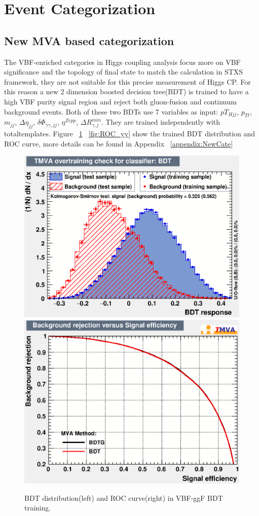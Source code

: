 \section{Event Categorization}
\label{sec:Category}

\subsection{New MVA based categorization}
The VBF-enriched categories in Higgs coupling analysis focus more on VBF significance and the topology of final state to match the calculation in STXS framework, they are not suitable  for this precise measurement of Higgs CP. For this reason a new 2 dimension boosted decision tree(BDT) is trained to have a high VBF purity signal region and reject both gluon-fusion and continuum \todo{$\gamma\gamma$} background events. Both of these two BDTs use 7 variables as input: $pT_{Hjj}$, $p_{Tt}$, $m_{jj}$, $\Delta\eta_{jj}$, $\delta\Phi_{\gamma\gamma, jj}$, $\eta^{Zepp}$, $\Delta R^{min}_{\gamma, j}$. They are trained independently with totaltemplates. Figure ~\ref{fig:ROC_ggh} ~\ref{fig:ROC_yy} show the trained BDT distribution and ROC curve, more details can be found in Appendix ~\ref{appendix:NewCate}
\begin{figure}[bp]
  \centering
  \includegraphics[width=0.45\linewidth]{figure/BDT/Perf_ggh/overtrain_BDT.eps}
  \includegraphics[width=0.45\linewidth]{figure/BDT/Perf_ggh/rejBvsS.eps}
  \caption{BDT distribution(left) and ROC curve(right) in VBF-ggF BDT training.}
  \label{fig:ROC_ggh}
\end{figure}


